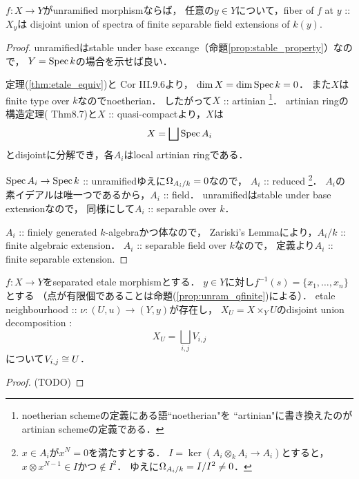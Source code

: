 \documentclass[a4paper]{jsarticle}
\begin{document}
\begin{Prop} \label{prop:unram_qfinite}
    $f \colon X \to Y$がunramified morphismならば，
    任意の$y \in Y$について，fiber of $f$ at $y$ :: $X_y$は
    disjoint union of spectra of finite separable field extensions of $k(y)$.
\end{Prop}
\begin{proof}
    unramifiedはstable under base excange（命題\ref{prop:stable_property}）なので，
    $Y=\operatorname{Spec} k$の場合を示せば良い．

    定理(\ref{thm:etale_equiv})と\cite{HarAG} Cor III.9.6より，
    $\dim X=\dim \operatorname{Spec} k=0$．
    また$X$はfinite type over $k$なのでnoetherian．
    したがって$X$ :: artinian
    \footnote{ noetherian schemeの定義にある語``noetherian"を
                ``artinian"に書き換えたのがartinian schemeの定義である． }．
    artinian ringの構造定理(\cite{Ati-Mac} Thm8.7)と$X$ :: quasi-compactより，$X$は
    \[ X=\bigsqcup \operatorname{Spec} A_i \]
    とdisjointに分解でき，各$A_i$はlocal artinian ringである．

    $\operatorname{Spec} A_i \to \operatorname{Spec} k$ :: unramifiedゆえに$\Omega_{A_i/k}=0$なので，
    $A_i$ :: reduced
    \footnote
    {
        $x \in A_i$が$x^{N}=0$を満たすとする．
        $I=\ker(A_i \otimes_k A_i \to A_i)$とすると，
        $x \otimes x^{N-1} \in I$かつ$\not \in I^2$．
        ゆえに$\Omega_{A_i/k}=I/I^2 \neq 0$．
    }．
    $A_i$の素イデアルは唯一つであるから，$A_i$ :: field．
    unramifiedはstable under base extensionなので，
    同様にして$A_i$ :: separable over $k$．

    $A_i$ :: finiely generated $k$-algebraかつ体なので，
    Zariski's Lemmaにより，$A_i/k$ :: finite algebraic extension．
    $A_i$ :: separable field over $k$なので，
    定義より$A_i$ :: finite separable extension.
\end{proof}

\begin{Prop}
    $f \colon X \to Y$をseparated etale morphismとする．
    $y \in Y$に対し$f^{-1}(s)=\{x_1,\dots,x_n \}$とする
    （点が有限個であることは命題(\ref{prop:unram_qfinite})による）．
    etale neighbourhood :: $\nu: (U, u) \to (Y, y)$が存在し，
    $X_U=X \times_{Y} U$のdisjoint union decomposition :
    \[ X_U=\bigsqcup_{i, j} V_{i, j} \]
    について$V_{i, j} \cong U$．
\end{Prop}
\begin{proof}
    (TODO)
\end{proof}
\end{document}
